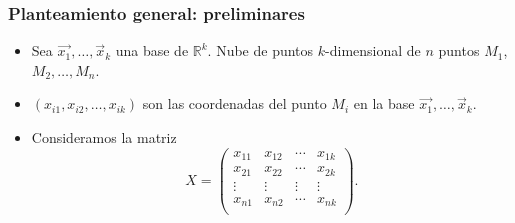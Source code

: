 \documentclass{beamer}
\newcommand{\field}[1]{\mathbb{#1}}
\newcommand{\R}{\field{R}}
\begin{document}
  \begin{frame}\frametitle{Planteamiento general: preliminares}
    \begin{itemize}
    \item<+-> Sea $\vec{x_1},\ldots,\vec{x}_k$ una base de $\R^k$. Nube de puntos $k$-dimensional de $n$ puntos $M_1$, $M_2,\ldots,M_n$.
    \item<+-> $(x_{i1},x_{i2},\ldots,x_{ik})$ son las coordenadas del punto $M_i$ en la base $\vec{x_1},\ldots,\vec{x}_k$.
    \item<+-> Consideramos la matriz
         \begin{equation*}
X=\left(\begin{array}{llll}
x_{11}&x_{12}&\cdots&x_{1k}\\
x_{21}&x_{22}&\cdots&x_{2k}\\
\vdots&\vdots&\vdots&\vdots\\
x_{n1}&x_{n2}&\cdots&x_{nk}\\
\end{array}\right).
\end{equation*}

    \end{itemize}
    
 \end{frame}
\end{document}
